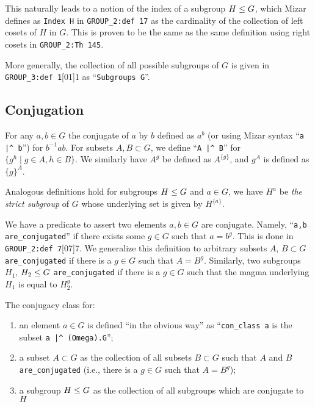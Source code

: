 This naturally leads to a notion of the index of a subgroup $H\leq G$,
which Mizar defines as \verb#Index H# in \verb#GROUP_2:def 17# as the
cardinality of the collection of left cosets of $H$ in $G$. This is
proven to be the same as the same definition using right cosets in
\verb#GROUP_2:Th 145#.

More generally, the collection of all possible subgroups of $G$ is given
in \verb#GROUP_3:def 1#[01]{1} as
``\verb#Subgroups G#''.

\subsection{Conjugation}
For any $a,b\in G$ the conjugate of $a$ by $b$ defined as $a^{b}$ (or
using Mizar syntax ``\verb#a |^ b#'')
for $b^{-1}ab$. For subsets $A,B\subset G$, we define
``\verb#A |^ B#'' for $\{g^{h}\mid g\in A,h\in B\}$. We similarly have
$A^{g}$ be defined as $A^{\{g\}}$, and $g^{A}$ is defined as $\{g\}^{A}$.

Analogous definitions hold for subgroups $H\leq G$ and $a\in G$, we
have $H^{a}$ be \emph{the strict subgroup} of $G$ whose underlying set
is given by $H^{\{a\}}$.

We have a predicate to assert two elements $a,b\in G$ are
conjugate. Namely, ``\verb#a,b are_conjugated#'' if there exists some
$g\in G$ such that $a = b^{g}$. This is done in
\verb#GROUP_2:def 7#[07]{7}. We generalize this
definition to arbitrary subsets $A$, $B\subset G$ \verb#are_conjugated# if
there is a $g\in G$ such that $A = B^{g}$. Similarly, two subgroups
$H_{1}$, $H_{2}\leq G$ \verb#are_conjugated# if there is a $g\in G$
such that the magma underlying $H_{1}$ is equal to $H_{2}^{g}$.

The conjugacy class for:
\begin{enumerate}
\item an element $a\in G$ is defined ``in the obvious way''
as ``\texttt{con\_class a}
is the subset \verb#a |^ (Omega).G#'';
\item a subset $A\subset G$ as the collection of all subsets $B\subset G$
such that $A$ and $B$ \verb#are_conjugated# (i.e., there is a $g\in G$
such that $A = B^{g}$);
\item a subgroup $H\leq G$ as the collection of all subgroups which
  are conjugate to $H$
\end{enumerate}

